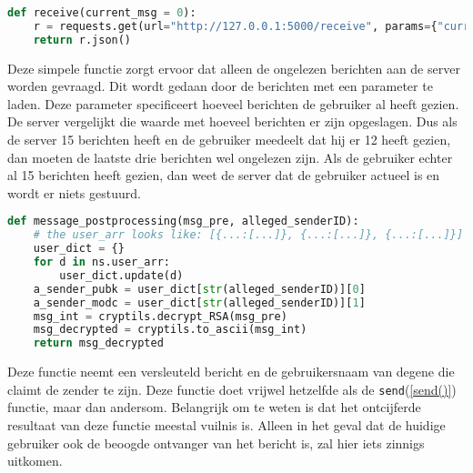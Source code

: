\documentclass{report} %
\let\code\lstinline
\begin{document}
\begin{lstlisting}[language=Python, firstnumber=70]
def receive(current_msg = 0):
    r = requests.get(url="http://127.0.0.1:5000/receive", params={"current" : current_msg})
    return r.json()
\end{lstlisting}\label{stuur_code}
Deze simpele functie zorgt ervoor dat alleen de ongelezen berichten aan de server worden gevraagd. Dit wordt gedaan door de berichten met een parameter te laden. Deze parameter specificeert hoeveel berichten de gebruiker al heeft gezien. De server vergelijkt die waarde met hoeveel berichten er zijn opgeslagen. Dus als de server 15 berichten heeft en de gebruiker meedeelt dat hij er 12 heeft gezien, dan moeten de laatste drie berichten wel ongelezen zijn. Als de gebruiker echter al 15 berichten heeft gezien, dan weet de server dat de gebruiker actueel is en wordt er niets gestuurd. \\

\begin{lstlisting}[language=Python, firstnumber=29]
def message_postprocessing(msg_pre, alleged_senderID):
    # the user_arr looks like: [{...:[...]}, {...:[...]}, {...:[...]}] etc. We convert it to {...:[...], ...:[...], ...:[...]}.
    user_dict = {}
    for d in ns.user_arr:
        user_dict.update(d)
    a_sender_pubk = user_dict[str(alleged_senderID)][0]
    a_sender_modc = user_dict[str(alleged_senderID)][1]
    msg_int = cryptils.decrypt_RSA(msg_pre)
    msg_decrypted = cryptils.to_ascii(msg_int)
    return msg_decrypted
\end{lstlisting}
Deze functie neemt een versleuteld bericht en de gebruikersnaam van degene die claimt de zender te zijn. Deze functie doet vrijwel hetzelfde als de \code{send}(\ref{send()}) functie, maar dan andersom. Belangrijk om te weten is dat het ontcijferde resultaat van deze functie meestal vuilnis is. Alleen in het geval dat de huidige gebruiker ook de beoogde ontvanger van het bericht is, zal hier iets zinnigs uitkomen. \\
\end{document}
